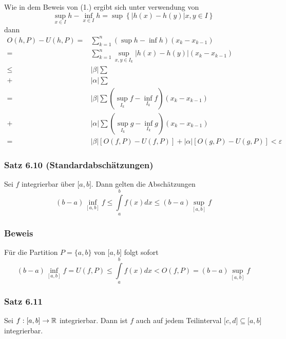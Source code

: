 \begin{enumerate}
Wie in dem Beweis von (1.) ergibt sich unter verwendung von \[\mathop {\sup }\limits_{x \in I} h - \mathop {\inf }\limits_{x \in I} h = \sup \left\{ {\left| {h(x) - h(y)} \right|x,y \in I} \right\}\]
dann 
\begin{align*}
O(h,P)-U(h,P) =&\sum\limits_{k = 1}^n {(\sup h - \inf h)({x_k} - {x_{k - 1}})} \\
 =&\sum\limits_{k = 1}^n {\mathop {\sup }\limits_{x,y \in {I_k}} \left| {h(x) - h(y)} \right|({x_k} - {x_{k - 1}})} \\
\le&\left| \beta  \right|\sum {\mathop {\mathop {\sup }\limits_{{I_k}} \left| {f(x) - f(y)} \right|({x_k} - {x_{k - 1}}) }}\\
+&\left| \alpha  \right|\sum {\mathop {\mathop {\sup }\limits_{{I_k}} \left| {g(x) - g(y)} \right|({x_k} - {x_{k - 1}})} } \\
=&\left| \beta  \right|\sum {(\mathop {\sup }\limits_{{I_k}} f - \mathop {\inf }\limits_{{I_k}} f)({x_k} - {x_{k - 1}})} \\
+&\left| \alpha  \right|\sum {(\mathop {\sup }\limits_{{I_k}} g - \mathop {\inf }\limits_{{I_k}} g)({x_k} - {x_{k - 1}})} \\
=&\left| \beta  \right|[O(f,P) - U(f,P)] + \left| \alpha  \right|[O(g,P) - U(g,P)] < \varepsilon 
\end{align*}
\end{enumerate}

\subsubsection*{Satz 6.10 (Standardabschätzungen)}
Sei $f$ integrierbar über $\lbrack a,b \rbrack$. Dann gelten die Abschätzungen \[(b - a)\mathop {\inf }\limits_{[a,b]} f \le \int\limits_a^b {f(x)dx \le (b - a)\mathop {\sup }\limits_{[a,b]} f} \] 
\subsubsection*{Beweis} 
Für die Partition $P=\{ a,b\}$ von $\lbrack a,b\rbrack$ folgt sofort \[(b - a)\mathop {\inf }\limits_{[a,b]} f = U(f,P) \le \int\limits_a^b {f(x)dx < O(f,P) = (b - a)\mathop {\sup }\limits_{[a,b]} f} \]

\subsubsection*{Satz 6.11}
Sei $f:\lbrack a,b\rbrack\to\mathbb{R}$ integrierbar. Dann ist $f$ auch auf jedem Teilinterval $\lbrack c,d\rbrack\subseteq\lbrack a,b\rbrack$ integrierbar. \\

